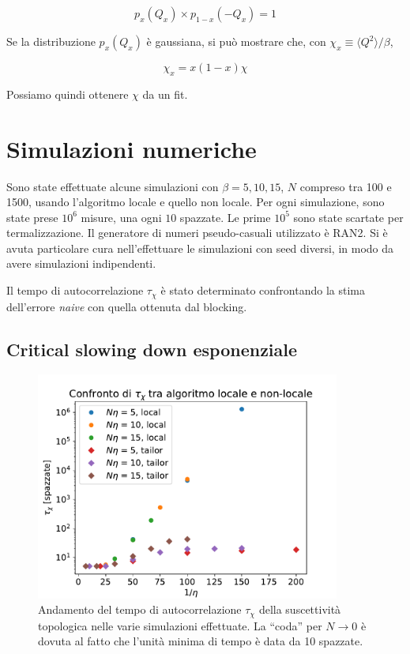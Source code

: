 \documentclass[a4paper,11pt]{article}
\newcommand{\avg}[1]{\langle {#1} \rangle}
\begin{document}
    \begin{equation}
        p_x (Q_x) \times p_{1-x} (- Q_x) = 1
    \end{equation}

    Se la distribuzione $p_x (Q_x)$ è gaussiana, si può mostrare che, con $\chi_x \equiv \avg{Q^2}/\beta$, 
    
    \begin{equation}
        \chi_x = x(1-x) \chi
    \end{equation}

    
    Possiamo quindi ottenere $\chi$ da un fit.
    
    \section{Simulazioni numeriche}
    
    Sono state effettuate alcune simulazioni con $\beta = 5, 10, 15$, $N$ compreso tra 100 e 1500, usando l'algoritmo locale e quello non locale. Per ogni simulazione, sono state prese $10^6$ misure, una ogni $10$ spazzate. Le prime $10^5$ sono state scartate per termalizzazione. Il generatore di numeri pseudo-casuali utilizzato è RAN2. Si è avuta particolare cura nell'effettuare le simulazioni con seed diversi, in modo da avere simulazioni indipendenti.
    
    Il tempo di autocorrelazione $\tau_\chi$ è stato determinato confrontando la stima dell'errore \emph{naive} con quella ottenuta dal blocking.
    
    \subsection{Critical slowing down esponenziale}
    
    \begin{figure}[htb]
        \centering
        \includegraphics[width=10cm]{figure/csd_autocorr.pdf}
        \caption{Andamento del tempo di autocorrelazione $\tau_\chi$ della suscettività topologica nelle varie simulazioni effettuate. La ``coda'' per $N \to 0$ è dovuta al fatto che l'unità minima di tempo è data da 10 spazzate.}
        \label{fig:csd_autocorr}
    \end{figure}
\end{document}
